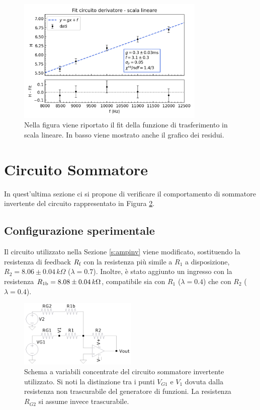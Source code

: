 \documentclass[a4paper,11pt]{article}
\begin{document}
\begin{figure}[h]
\centering
\includegraphics[width=0.8\textwidth]{images/fit_amp_lin}
\caption{\footnotesize Nella figura viene riportato il fit della funzione di trasferimento in scala
  lineare. In basso viene mostrato anche il grafico dei residui.}\label{fig:fit_lin}
\end{figure}

\section{Circuito Sommatore}
\label{sec:circuito-sommatore}

In quest'ultima sezione ci si propone di verificare il comportamento di
sommatore invertente del circuito rappresentato in Figura \ref{fig:circ_sum}.

\subsection{Configurazione sperimentale}
\label{sec:conf-sper-1}

Il circuito utilizzato nella Sezione \ref{s:ampinv} viene modificato, sostituendo la resistenza di
feedback $R_{\text f}$ con la resistenza più simile a $R_{1}$ a
disposizione, $R_{2} = 8.06 \pm 0.04 \,k\Omega$ ($\lambda = 0.7 $). Inoltre, è stato aggiunto
un ingresso con la resistenza $R_{1\text b} = 8.08 \pm 0.04 \,k\Omega$, compatibile sia con $R_{1}$ ($\lambda  = 0.4$) che con $R_{2}$ ($\lambda = 0.4$).


\begin{figure}
\centering
\includegraphics[width=0.5\textwidth]{images/circuit_sum}
\caption{\footnotesize Schema a variabili concentrate del circuito sommatore
  invertente utilizzato. Si noti la distinzione tra i punti $V_{G1}$ e $V_{1}$ dovuta dalla
  resistenza non trascurabile del generatore di funzioni. La resistenza $R_{G2}$ si assume
  invece trascurabile.}\label{fig:circ_sum}
\end{figure}
\end{document}
